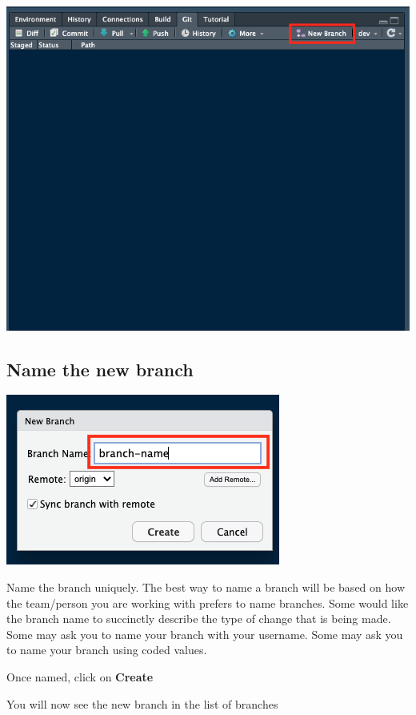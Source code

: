 \documentclass[
  12pt,
]{book}
\begin{document}
\includegraphics{images/git_branch1.png}

\hypertarget{name-the-new-branch}{%
\subsection{Name the new branch}\label{name-the-new-branch}}

\includegraphics{images/git_branch2.png}

Name the branch uniquely. The best way to name a branch will be based on how the team/person you are working with prefers to name branches. Some would like the branch name to succinctly describe the type of change that is being made. Some may ask you to name your branch with your username. Some may ask you to name your branch using coded values.

Once named, click on \textbf{Create}

You will now see the new branch in the list of branches
\end{document}
